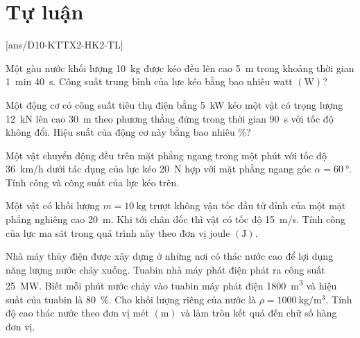 \section{Tự luận}
\setcounter{ex}{0}
[ans/D10-KTTX2-HK2-TL]
\begin{ex}
	Một gàu nước khối lượng \SI{10}{\kilogram} được kéo đều lên cao \SI{5}{\meter} trong khoảng thời gian \SI{1}{\minute} \SI{40}{\second}. Công suất trung bình của lực kéo bằng bao nhiêu watt $\left(\si{\watt}\right)$?
\end{ex}
\begin{ex}
	Một động cơ có công suất tiêu thụ điện bằng \SI{5}{\kilo\watt} kéo một vật có trọng lượng \SI{12}{\kilo\newton} lên cao \SI{30}{\meter} theo phương thẳng đứng trong thời gian \SI{90}{\second} với tốc độ không đổi. Hiệu suất của động cơ này bằng bao nhiêu \si{\percent}?
\end{ex}
\begin{ex}
	Một vật chuyển động đều trên mặt phẳng ngang trong một phút với tốc độ \SI{36}{\kilo\meter/\hour} dưới tác dụng của lực kéo \SI{20}{\newton} hợp với mặt phẳng ngang góc $\alpha=\SI{60}{\degree}$. Tính công và công suất của lực kéo trên.
\end{ex}
\begin{ex}
	Một vật có khối lượng $m=\SI{10}{\kilogram}$ trượt không vận tốc đầu từ đỉnh của một mặt phẳng nghiêng cao \SI{20}{\meter}. Khi tới chân dốc thì vật có tốc độ \SI{15}{\meter/\second}. Tính công của lực ma sát trong quá trình này theo đơn vị joule $\left(\si{\joule}\right)$.
\end{ex}
\begin{ex}
	Nhà máy thủy điện được xây dựng ở những nơi có thác nước cao để lợi dụng năng lượng nước chảy xuống. Tuabin nhà máy phát điện phát ra công suất \SI{25}{\mega\watt}. Biết mỗi phút nước chảy vào tuabin máy phát điện \SI{1800}{\meter^3} và hiệu suất của tuabin là \SI{80}{\percent}. Cho khối lượng riêng của nước là $\rho=\SI{1000}{\kilogram/\meter^3}$. Tính độ cao thác nước theo đơn vị mét $\left(\si{\meter}\right)$ và làm tròn kết quả đến chữ số hàng đơn vị.
\end{ex}

